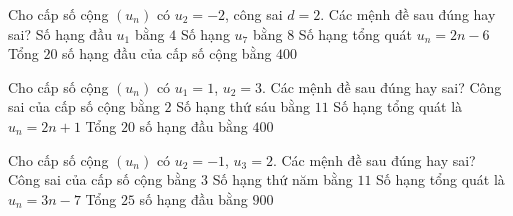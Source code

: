 \begin{ex}%
 Cho cấp số cộng $(u_n)$ có $u_2=-2$, công sai $d=2$. Các mệnh đề sau đúng  hay sai?
  \choiceTF
  {Số hạng đầu $u_1$  bằng $4$}
  {\True  Số hạng $u_7$ bằng $8$}
   {\True Số hạng tổng quát $u_n=2n-6$}
  {Tổng $20$ số hạng đầu của cấp  số cộng bằng $400$}
\end{ex}

\begin{ex}%
 Cho cấp số cộng $(u_n)$ có $u_1=1$, $u_2=3$. Các mệnh đề sau  đúng hay sai?
  \choiceTF
  {\True Công sai của  cấp số cộng bằng $2$}
  {\True Số hạng  thứ sáu bằng $11$}
   {Số hạng tổng quát là $u_n=2n+1$}
  {\True Tổng $20$  số hạng đầu bằng $400$}
\end{ex}

\begin{ex}%
 Cho cấp số cộng $(u_n)$ có $u_2=-1$, $u_3=2$. Các mệnh đề sau đúng hay  sai?
  \choiceTF
  {\True Công sai của cấp  số cộng bằng $3$}
  {Số hạng thứ năm bằng  $11$}
  {\True Số hạng tổng quát là  $u_n=3n-7$}
   {Tổng $25$ số hạng đầu bằng $900$}
\end{ex}

